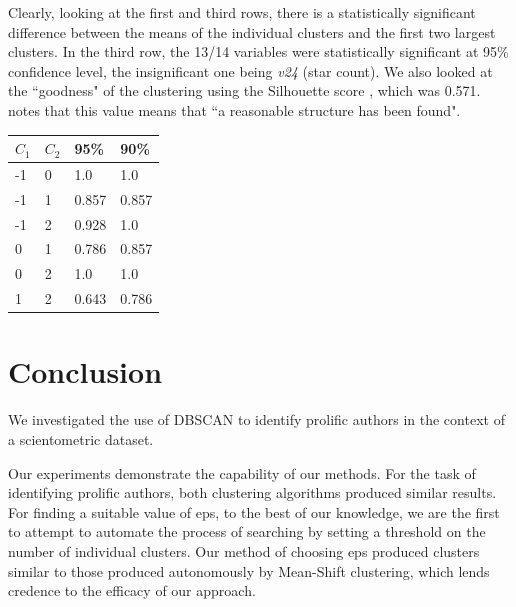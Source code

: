 \documentclass[smallextended]{svjour3}
\begin{document}
	Clearly, looking at the first and third rows, there is a statistically significant difference between the means of the individual clusters and the first two largest clusters. In the third row, the 13/14 variables were statistically significant at 95\% confidence level, the insignificant one being \textit{v24} (star count). We also looked at the ``goodness" of the clustering using the Silhouette score \cite{rousseeuw1987silhouettes}, which was 0.571. \cite{kaufman2009finding} notes that this value means that ``a reasonable structure has been found".\\
	
	\begingroup
	\endgroup
	\begin{tabular}{llll}
		\hline 
		$C_1$ & $C_2$ & \textbf{95\%} & \textbf{90\%} \\ 
		\hline 
		-1 & 0 & 1.0 & 1.0 \\ 
		\hline 
		-1 & 1 & 0.857 & 0.857 \\ 
		\hline 
		-1 & 2 & 0.928 & 1.0 \\ 
		\hline 
		0 & 1 & 0.786 & 0.857 \\ 
		\hline 
		0 & 2 & 1.0 & 1.0 \\ 
		\hline 
		1 & 2 & 0.643 & 0.786 \\ 
		\hline 
	\end{tabular} 
	
	\hfill\break
	
	\section{Conclusion}
	We investigated the use of DBSCAN to identify prolific authors in the context of a scientometric dataset.
	
	Our experiments demonstrate the capability of our methods.  For the task of identifying prolific authors, both clustering algorithms produced similar results. For finding a suitable value of eps, to the best of our knowledge, we are the first to attempt to automate the process of searching by setting a threshold on the number of individual clusters. Our method of choosing eps produced clusters similar to those produced autonomously by Mean-Shift clustering, which lends credence to the efficacy of our approach.
	
	
	
\end{document}
